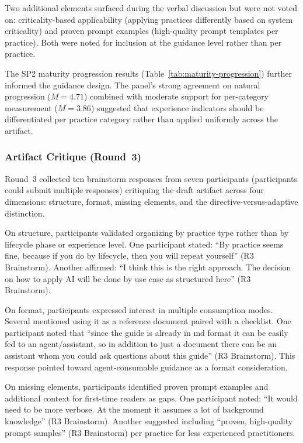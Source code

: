 Two additional elements surfaced during the verbal discussion but were not voted
on: criticality-based applicability (applying practices differently based on
system criticality) and proven prompt examples (high-quality prompt templates per
practice). Both were noted for inclusion at the guidance level rather than per
practice.

The SP2 maturity progression results
(Table~\ref{tab:maturity-progression}) further informed the guidance design. The
panel's strong agreement on natural progression ($M = 4.71$) combined with
moderate support for per-category measurement ($M = 3.86$) suggested that
experience indicators should be differentiated per practice category rather than
applied uniformly across the artifact.

\subsubsection{Artifact Critique (Round~3)}\label{subsubsec:artifact-critique}

Round~3 collected ten brainstorm responses from seven participants (participants
could submit multiple responses) critiquing the draft artifact across
four dimensions: structure, format, missing elements, and the
directive-versus-adaptive distinction.

On structure, participants validated organizing by practice type rather than by
lifecycle phase or experience level. One participant stated: ``By practice seems
fine, because if you do by lifecycle, then you will repeat yourself'' (R3
Brainstorm). Another affirmed: ``I think this is the right approach. The decision
on how to apply AI will be done by use case as structured here'' (R3 Brainstorm).

On format, participants expressed interest in multiple consumption modes. Several
mentioned using it as a reference document paired with a checklist. One
participant noted that ``since the guide is already in md format it can be easily
fed to an agent/assistant, so in addition to just a document there can be an
assistant whom you could ask questions about this guide'' (R3 Brainstorm). This
response pointed toward agent-consumable guidance as a format consideration.

On missing elements, participants identified proven prompt examples and additional
context for first-time readers as gaps. One participant noted: ``It would need to
be more verbose. At the moment it assumes a lot of background knowledge'' (R3
Brainstorm). Another suggested including ``proven, high-quality prompt samples'' (R3 Brainstorm)
per practice for less experienced practitioners.


